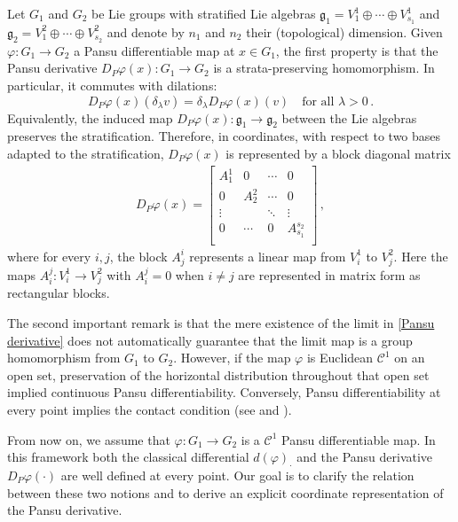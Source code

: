 \documentclass[dvipsnames]{amsart}
\theoremstyle{definition}
\theoremstyle{definition}
\numberwithin{equation}{section}
\begin{document}
Let $G_1$ and $G_2$ be Lie groups with stratified Lie algebras $\mathfrak{g}_1 = V_1^1 \oplus \cdots \oplus V_{s_1}^1$ and $\mathfrak{g}_2 = V_1^2 \oplus \cdots \oplus V_{s_2}^2$ and denote by $n_1$ and $n_2$ their (topological) dimension. 
Given $\varphi : G_1 \rightarrow G_2$ a Pansu differentiable map at $x\in G_1$, the first property is that the Pansu derivative  $D_P\varphi(x):G_1 \rightarrow G_2$ is a strata-preserving homomorphism. In particular, it commutes with dilations:
    \begin{equation*}
        D_P\varphi(x)(\delta_{\lambda} v) = \delta_{\lambda} D_P\varphi(x)(v) \quad \text{for all } \lambda>0\,.
    \end{equation*}
Equivalently, the induced map $D_P\varphi(x) : \mathfrak{g}_1 \rightarrow \mathfrak{g}_2$ between the Lie algebras preserves the stratification. Therefore, in coordinates, with respect to two bases adapted to the stratification, $D_P\varphi(x)$ is represented by a block diagonal matrix
    \begin{align*}
        D_P\varphi(x)=\begin{bmatrix}
            A_1^1 & 0 & \cdots  & 0\\
            0 & A_2^2 & \cdots  & 0\\
            \vdots &  & \ddots & \vdots\\
            0 & \cdots & 0 & A_{s_1}^{s_2}\\
            \end{bmatrix}\,,
    \end{align*}
    where for every $i, j$, the block $A_j^i$ represents a linear map from $V_i^1$ to $V_j^2$. Here the maps $A_i^j\colon V_i^1\to V_j^2$ with $A_{i}^j=0$ when $i\neq j$ are represented in matrix form as rectangular blocks.
    
The second important remark is that the mere existence of the limit in \eqref{Pansu derivative} does not automatically guarantee that the limit map is a group homomorphism from $G_1$ to $G_2$. However, if the map $\varphi$ is  Euclidean $\mathcal{C}^1$ on an open set, preservation of the horizontal distribution throughout that open set implied continuous Pansu differentiability. Conversely, Pansu differentiability at every point implies the contact condition (see \cite{Pansu-quasiconformal} and \cite[Theorem 1.1]{Magnani_2013}).
\medskip

From now on, we assume that $\varphi : G_1 \to G_2$ is a $\mathcal{C}^1$ Pansu differentiable map. In this framework both the classical differential $d(\varphi)_{\cdot}$ and the Pansu derivative $D_P\varphi(\cdot)$ are well defined at every point. Our goal is to clarify the relation between these two notions and to derive an explicit coordinate representation of the Pansu derivative.
\end{document}
